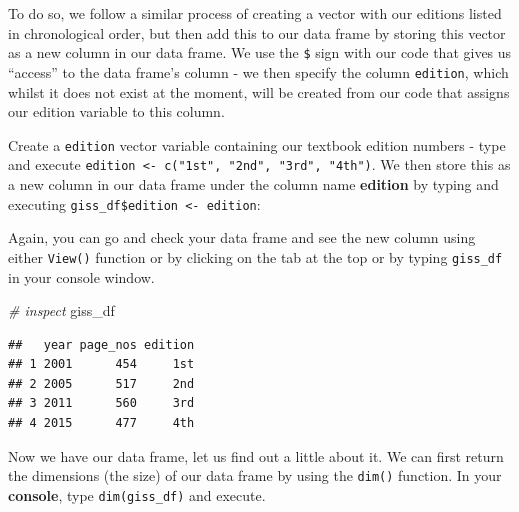 \documentclass[
]{book}
\newenvironment{Shaded}{\begin{snugshade}}{\end{snugshade}}
\newcommand{\CommentTok}[1]{\textcolor[rgb]{0.56,0.35,0.01}{\textit{#1}}}
\newcommand{\FunctionTok}[1]{\textcolor[rgb]{0.00,0.00,0.00}{#1}}
\newcommand{\NormalTok}[1]{#1}
\newcommand{\OtherTok}[1]{\textcolor[rgb]{0.56,0.35,0.01}{#1}}
\newcommand{\SpecialCharTok}[1]{\textcolor[rgb]{0.00,0.00,0.00}{#1}}
\newcommand{\StringTok}[1]{\textcolor[rgb]{0.31,0.60,0.02}{#1}}
\begin{document}
To do so, we follow a similar process of creating a vector with our editions listed in chronological order, but then add this to our data frame by storing this vector as a new column in our data frame. We use the \texttt{\$} sign with our code that gives us ``access'' to the data frame's column - we then specify the column \texttt{edition}, which whilst it does not exist at the moment, will be created from our code that assigns our edition variable to this column.

Create a \texttt{edition} vector variable containing our textbook edition numbers - type and execute \texttt{edition\ \textless{}-\ c("1st",\ "2nd",\ "3rd",\ "4th")}. We then store this as a new column in our data frame under the column name \textbf{edition} by typing and executing \texttt{giss\_df\$edition\ \textless{}-\ edition}:

\begin{Shaded}
\end{Shaded}

Again, you can go and check your data frame and see the new column using either \texttt{View()} function or by clicking on the tab at the top or by typing \texttt{giss\_df} in your console window.

\begin{Shaded}
\begin{Highlighting}[]
\CommentTok{\# inspect}
\NormalTok{giss\_df}
\end{Highlighting}
\end{Shaded}

\begin{verbatim}
##   year page_nos edition
## 1 2001      454     1st
## 2 2005      517     2nd
## 3 2011      560     3rd
## 4 2015      477     4th
\end{verbatim}

Now we have our data frame, let us find out a little about it. We can first return the dimensions (the size) of our data frame by using the \texttt{dim()} function. In your \textbf{console}, type \texttt{dim(giss\_df)} and execute.
\end{document}
